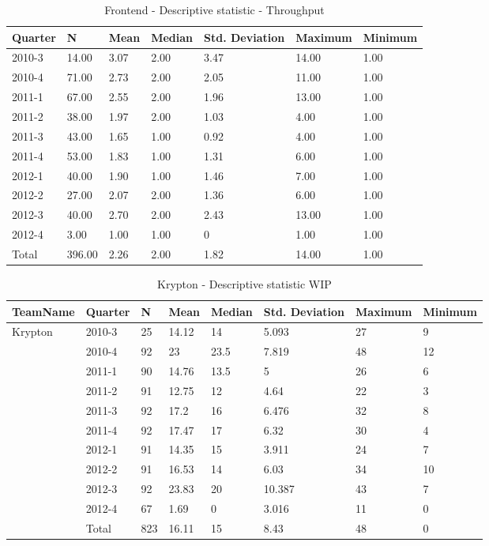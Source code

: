 \documentclass[UKenglish]{ifimaster}  %
\begin{document}
   \begin{table}[!htbp]
   \centering
 \begin{tabular}{ | l | l | l | l | l | l | l | }
\hline
	Quarter & N & Mean & Median & Std. Deviation & Maximum & Minimum \\ \hline
	2010-3 & 14.00 & 3.07 & 2.00 & 3.47 & 14.00 & 1.00\\ \hline
	2010-4 & 71.00 & 2.73 & 2.00 & 2.05 & 11.00 & 1.00\\ \hline
	2011-1 & 67.00 & 2.55 & 2.00 & 1.96 & 13.00 & 1.00\\ \hline
	2011-2 & 38.00 & 1.97 & 2.00 & 1.03 & 4.00 & 1.00\\ \hline
	2011-3 & 43.00 & 1.65 & 1.00 & 0.92 & 4.00 & 1.00\\ \hline
	2011-4 & 53.00 & 1.83 & 1.00 & 1.31 & 6.00 & 1.00\\ \hline
	2012-1 & 40.00 & 1.90 & 1.00 & 1.46 & 7.00 & 1.00\\ \hline
	2012-2 & 27.00 & 2.07 & 2.00 & 1.36 & 6.00 & 1.00\\ \hline
	2012-3 & 40.00 & 2.70 & 2.00 & 2.43 & 13.00 & 1.00\\ \hline
	2012-4 & 3.00 & 1.00 & 1.00 & 0 & 1.00 & 1.00\\ \hline
	Total & 396.00 & 2.26 & 2.00 & 1.82 & 14.00 & 1.00\\ \hline
	 \end{tabular}
  	  \caption{Frontend - Descriptive statistic - Throughput }%
\end{table}
\begin{table}[!htbp]
\begin{tabular}{ | l | l | l | l | l | l | l | l | }
\hline
TeamName & Quarter & N & Mean & Median & Std. Deviation & Maximum & Minimum \\ \hline
Krypton & 2010-3 & 25 & 14.12 & 14 & 5.093 & 27 & 9 \\ \hline
	 & 2010-4 & 92 & 23 & 23.5 & 7.819 & 48 & 12 \\ \hline
	 & 2011-1 & 90 & 14.76 & 13.5 & 5 & 26 & 6 \\ \hline
	 & 2011-2 & 91 & 12.75 & 12 & 4.64 & 22 & 3 \\ \hline
	 & 2011-3 & 92 & 17.2 & 16 & 6.476 & 32 & 8 \\ \hline
	 & 2011-4 & 92 & 17.47 & 17 & 6.32 & 30 & 4 \\ \hline
	 & 2012-1 & 91 & 14.35 & 15 & 3.911 & 24 & 7 \\ \hline
	 & 2012-2 & 91 & 16.53 & 14 & 6.03 & 34 & 10 \\ \hline
	 & 2012-3 & 92 & 23.83 & 20 & 10.387 & 43 & 7 \\ \hline
	 & 2012-4 & 67 & 1.69 & 0 & 3.016 & 11 & 0 \\ \hline
	 & Total & 823 & 16.11 & 15 & 8.43& 48 & 0 \\ \hline
\end{tabular}
\caption{Krypton - Descriptive statistic WIP}
\end{table} 	
\end{document}
